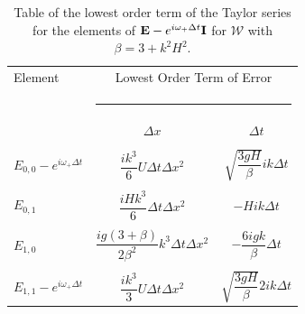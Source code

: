 \begin{table}
	\begin{tabular}{l  c c}
	\hline
		Element & \multicolumn{2}{c}{Lowest Order Term of Error}\\
		&  \multicolumn{2}{l}{\rule{0.7\textwidth}{0.4pt}} \\
		& $\Delta x$&$\Delta t$\\
		\hline && \\
		$E_{0,0} -  e^{i \omega_+ \Delta t} $&  $\dfrac{ik^3}{6} U \Delta t \Delta x^2$ & $ \sqrt{\dfrac{3gH}{\beta}} ik \Delta t $ \\ & & \\
		$E_{0,1}$& $\dfrac{iHk^3}{6} \Delta t \Delta x^2$ &  $-Hi k \Delta t$ \\ & & \\
		$E_{1,0}$& $ \dfrac{ig \left(3 + \beta\right)}{2\beta^2} k^3\Delta t \Delta x^2$ &  $ -\dfrac{6igk}{\beta} \Delta t$ \\ & & \\
		$E_{1,1} -  e^{i \omega_+ \Delta t}$& $\dfrac{ik^3}{3} U \Delta t \Delta x^2$ & $ \sqrt{\dfrac{3gH}{\beta}} 2ik \Delta t $ \\  \hline
	\end{tabular}
	\caption{Table of the lowest order term of the Taylor series for the elements of $\mathbf{E} - e^{i \omega_+ \Delta t} \mathbf{I}$ for $\mathcal{W}$ with $\beta = 3 + k^2 H^2$.}
	\label{tab:EerrW} 
\end{table}




